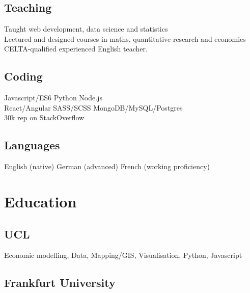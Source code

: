 \documentclass[a4paper,nomath]{deedy-resume} %
\begin{document}
\begin{paracol}{2}
    \subsection{Teaching}
    \textbullet{} Taught web development, data science and statistics \\
    \textbullet{} Lectured and designed courses in maths, quantitative research and economics \\
    \textbullet{} CELTA-qualified experienced English teacher. \\
    
    \subsection{Coding}

    Javascript/ES6 \textbullet{} Python \textbullet Node.js \\
    React/Angular \textbullet{} SASS/SCSS \textbullet{} MongoDB/MySQL/Postgres \\
    30k rep on StackOverflow

    \sectionspace %

    \subsection{Languages}
    English (native) \textbullet{} German (advanced) \textbullet{} French (working proficiency)


    \section{Education} 
    
    \subsection{UCL}
    
    Economic modelling, Data, Mapping/GIS, Visualisation, Python, Javascript
    \sectionspace

    \subsection{Frankfurt University}


\end{paracol}
\end{document}

